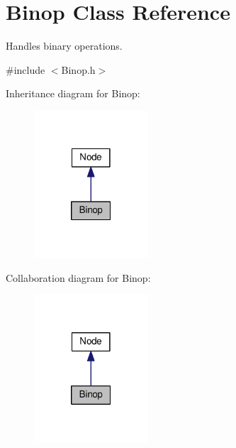 \hypertarget{classBinop}{}\section{Binop Class Reference}
\label{classBinop}


Handles binary operations.  




{\ttfamily \#include $<$Binop.\+h$>$}



Inheritance diagram for Binop\+:\nopagebreak
\begin{figure}[H]
\begin{center}
\leavevmode
\includegraphics[width=121pt]{classBinop__inherit__graph}
\end{center}
\end{figure}


Collaboration diagram for Binop\+:\nopagebreak
\begin{figure}[H]
\begin{center}
\leavevmode
\includegraphics[width=121pt]{classBinop__coll__graph}
\end{center}
\end{figure}
